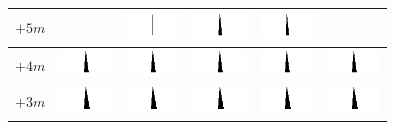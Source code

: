 \begin{figure}
	\centering
	\begin{tabular}{|c|c|c|c|c|c|}
		\hline 
		$+5m$ & &
		\includegraphics[width=1.4cm]{PositionWinkel/Winkel_-100_500.png} &
		\includegraphics[width=1.4cm]{PositionWinkel/Winkel_0_500.png} &
		\includegraphics[width=1.4cm]{PositionWinkel/Winkel_100_500.png} & \\ 
		\hline 
		$+4m$ & \includegraphics[width=1.4cm]{PositionWinkel/Winkel_-200_400.png} &
		\includegraphics[width=1.4cm]{PositionWinkel/Winkel_-100_400.png} &
		\includegraphics[width=1.4cm]{PositionWinkel/Winkel_0_400.png} &
		\includegraphics[width=1.4cm]{PositionWinkel/Winkel_100_400.png} &
		\includegraphics[width=1.4cm]{PositionWinkel/Winkel_200_400.png} \\ 
		\hline 
		$+3m$ & \includegraphics[width=1.4cm]{PositionWinkel/Winkel_-200_300.png} & \includegraphics[width=1.4cm]{PositionWinkel/Winkel_-100_300.png} & \includegraphics[width=1.4cm]{PositionWinkel/Winkel_0_300.png} & \includegraphics[width=1.4cm]{PositionWinkel/Winkel_100_300.png} & \includegraphics[width=1.4cm]{PositionWinkel/Winkel_200_300.png} \\ 

\end{tabular}
\end{figure}
